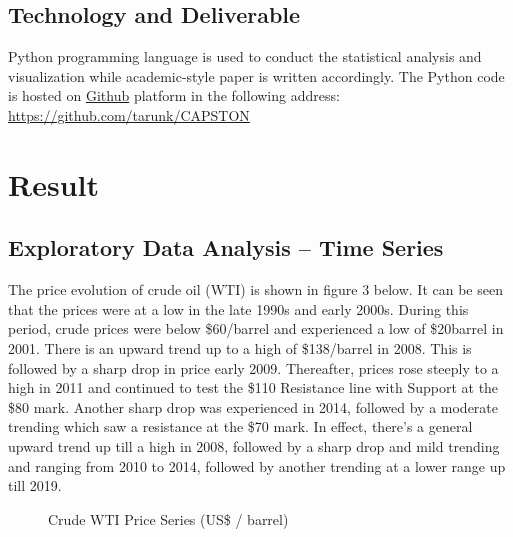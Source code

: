 \documentclass[a4paper,10pt]{article}
\begin{document}
\subsection {Technology and Deliverable}
Python programming language is used to conduct the statistical analysis and visualization while academic-style paper is written accordingly. The Python code is hosted on \href{https://github.com/tarunk/CAPSTON}{Github}
platform in the following address: \url{https://github.com/tarunk/CAPSTON}

\section{Result}
\subsection{Exploratory Data Analysis – Time Series}
The price evolution of crude oil (WTI) is shown in figure 3 below. It can be seen that the prices were at a low in the late 1990s and early 2000s. During this period, crude prices were below \$60/barrel and experienced a low of \$20\/barrel in 2001. There is an upward trend up to a high of \$138/barrel in 2008. This is followed by a sharp drop in price early 2009. Thereafter, prices rose steeply to a high in 2011 and continued to test the \$110 Resistance line with Support at the \$80 mark. Another sharp drop was experienced in 2014, followed by a moderate trending which saw a resistance at the \$70 mark.  In effect, there’s a general upward trend up till a high in 2008, followed by a sharp drop and mild trending and ranging from 2010 to 2014, followed by another trending at a lower range up till 2019.
\begin{figure}[!ht]
    \centering
	\noindent{}
	\caption[Oil Price]{Crude WTI Price Series (US\$ / barrel)}
    \label{fig:oilprice3}
\end{figure}
\end{document}
